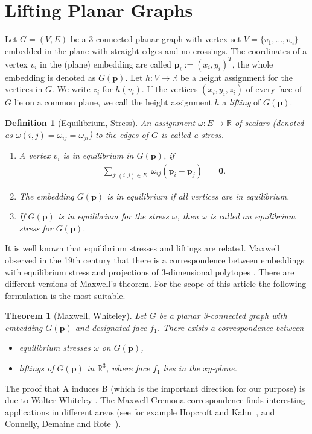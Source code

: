 \documentclass{article}
\theoremstyle{plain} \newtheorem{thm}{Theorem}[section]
\newtheorem{defn}{Definition}
\newcommand{\p}{\mathbf{p}}
\newcommand{\R}{\mathbb{R}}
\begin{document}
\section{Lifting Planar Graphs}
\label{sec:lifting}

Let $G=(V,E)$ be a $3$-connected planar graph with vertex set $V=\{v_{1},\ldots,v_{n}\}$ embedded in the plane with straight edges and no crossings.
The coordinates of a vertex $v_{i}$ in the (plane) embedding are called $\p_{i}:=(x_{i},y_{i})^{T}$, the whole embedding is denoted as $G(\p)$. 
Let $h\colon V\to \R$ be a height assignment for the vertices in $G$. We write $z_{i}$ for $h(v_{i})$.
If the vertices $(x_{i},y_{i},z_{i})$ of every face of $G$ lie on a common plane, we call the height assignment $h$ a \textit{lifting} of $G(\p)$.


\begin{defn}[Equilibrium, Stress]
  An assignment $\omega \colon E\to \R$ of scalars \textup(denoted as
  $\omega(i,j)=\omega_{ij}=\omega_{ji}$\textup) to the edges of $G$ is
  called a \emph{stress}.
\begin{enumerate}
\item A vertex $v_i$ is in equilibrium in $G(\p)$, if
\begin{align}\label{equ:equilibrium}
\sum_{j:(i,j) \in E} \; \omega_{ij}(\p_i-\p_j) \;
= \; \mathbf{0}.
\end{align}
\item The embedding $G(\p)$ is in equilibrium if all vertices
  are in equilibrium.
\item If $G(\p)$ is in equilibrium for the stress $\omega$, then
  $\omega$ is called an equilibrium stress for $G(\p)$.
\end{enumerate}
\end{defn}
It is well known that equilibrium stresses and liftings are related.
Maxwell observed
in the 19th century
 that there is a correspondence between
embeddings with equilibrium stress and projections of 3-dimensional
polytopes \cite{m-rfdf-64}. 
There are different versions of Maxwell's
theorem. For the scope of this article the following formulation is the most
suitable. 
\begin{thm}[Maxwell,
  Whiteley] Let $G$ be a planar 3-connected graph with embedding $G(\p)$ and 
designated face $f_1$. There exists a correspondence between
\begin{itemize}
\item[\rm A)] equilibrium stresses $\omega$ on $G(\p)$,
\item[\rm B)] liftings of $G(\p)$ in $\R^3$, where face $f_1$ lies in the
  $xy$-plane.
\end{itemize}
\end{thm}
The proof that A induces B (which is the important direction for our purpose) is  due to Walter Whiteley \cite{w-mspp-82}. The Maxwell-Cremona correspondence finds interesting applications in different areas (see for example
Hopcroft and  Kahn~\cite{hk-prga-92}, and Connelly, Demaine and Rote~\cite{cdr-spcpc-03}).
\end{document}
